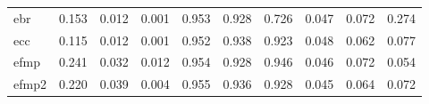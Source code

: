 \begin{tabular}{l:rrr:rrr:rrr}
	\acrshort{ebr}                              & 0.153          & 0.012          & 0.001          & 0.953 & 0.928 & 0.726 & 0.047 & 0.072 & 0.274 \\
	\acrshort{ecc}                              & 0.115          & 0.012          & 0.001          & 0.952 & 0.938 & 0.923 & 0.048 & 0.062 & 0.077 \\
	\hline
	\acrshort{efmp}                             & 0.241          & 0.032          & 0.012          & 0.954 & 0.928 & 0.946 & 0.046 & 0.072 & 0.054 \\
	\acrshort{efmp2}                            & 0.220          & 0.039          & 0.004          & 0.955 & 0.936 & 0.928 & 0.045 & 0.064 & 0.072 \\
	\bottomrule
\end{tabular}
